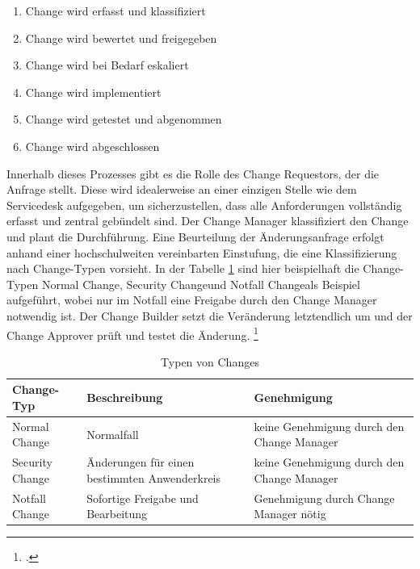 \begin{enumerate}
	\item Change wird erfasst und klassifiziert
	\item Change wird bewertet und freigegeben
	\item Change wird bei Bedarf eskaliert
	\item Change wird implementiert
	\item Change wird getestet und abgenommen
	\item Change wird abgeschlossen
\end{enumerate}

Innerhalb dieses Prozesses gibt es die Rolle des Change Requestors, der die Anfrage stellt. Diese wird 
idealerweise an einer einzigen Stelle wie dem Servicedesk aufgegeben, um sicherzustellen, dass alle 
Anforderungen vollständig erfasst und zentral gebündelt sind. Der Change Manager klassifiziert den 
Change und plant die Durchführung. Eine Beurteilung der Änderungsanfrage erfolgt anhand einer 
hochschulweiten vereinbarten Einstufung, die eine Klassifizierung nach Change-Typen vorsieht. In der 
Tabelle \ref{tab_typen_von_changes} sind hier beispielhaft die Change-Typen \glqq Normal Change\grqq, \glqq 
Security Change\grqq und \glqq Notfall Change\grqq als Beispiel aufgeführt, wobei nur im Notfall eine 
Freigabe durch den Change Manager notwendig ist. Der Change Builder setzt die Veränderung 
letztendlich um und der Change Approver prüft und testet die Änderung. 
\footcite[Vgl.][48]{breiter_implementierung_2011}

\begin{table}[h!]
	\begin{tabularx}{\textwidth}{|X|X|X|}
		\hline \textbf{Change-Typ} & \textbf{Beschreibung} & \textbf{Genehmigung}\\
		\hline Normal Change & Normalfall & keine Genehmigung durch den Change Manager\\ 
		\hline Security Change & Änderungen für einen bestimmten Anwenderkreis & keine Genehmigung 			durch den Change Manager\\
		\hline Notfall Change & Sofortige Freigabe und Bearbeitung & Genehmigung durch Change 				Manager nötig\\
		\hline
	\end{tabularx}
	\caption{Typen von Changes\protect \footnotemark}
	\label{tab_typen_von_changes}
\end{table}

